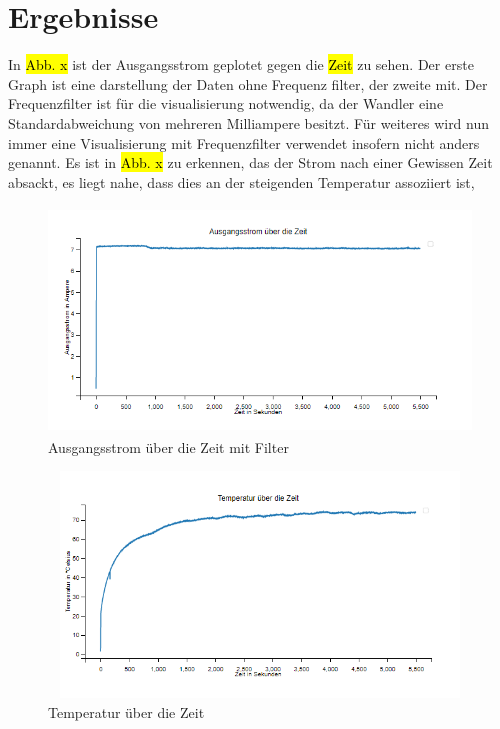\section{Ergebnisse}

\begin{flushleft}
In \hl{Abb. x} ist der Ausgangsstrom geplotet gegen die \hl{Zeit} zu sehen. Der erste Graph ist eine darstellung der Daten ohne Frequenz filter, der zweite mit. Der Frequenzfilter ist für die visualisierung notwendig, da der Wandler eine Standardabweichung von mehreren Milliampere besitzt. Für weiteres wird nun immer eine Visualisierung mit Frequenzfilter verwendet insofern nicht anders genannt. Es ist in \hl{Abb. x} zu erkennen, das der Strom nach einer Gewissen Zeit absackt, es liegt nahe, dass dies an der steigenden Temperatur assoziiert ist,
\end{flushleft}

\begin{figure}
    \centering
    \includegraphics[height= 6cm, width = 12cm]{Pictures/B1_3P_IOUT.png}
    \caption{Ausgangsstrom über die Zeit mit Filter}
\end{figure}


\begin{figure}
    \centering
    \includegraphics[height= 6cm, width = 12cm]{Pictures/B1_3P_TEMP.png}
    \caption{Temperatur über die Zeit}
\end{figure}


